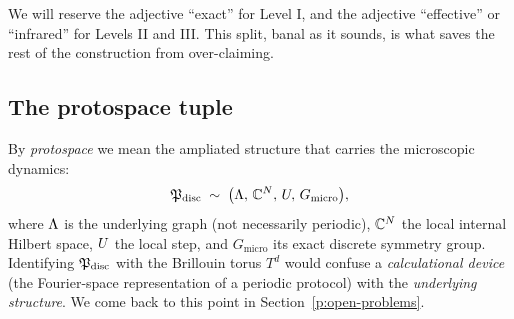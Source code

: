 We will reserve the adjective \enquote{exact} for Level I, and the
adjective \enquote{effective} or \enquote{infrared} for Levels II and
III. This split, banal as it sounds, is what saves the rest of the
construction from over-claiming.

\subsection{The protospace tuple}
By \emph{protospace} we mean the ampliated structure that carries the
microscopic dynamics:
\begin{equation}
\mathfrak{P}_{\mathrm{disc}} \;\sim\; \bigl(\Lambda,\,\mathbb{C}^{N},\,U,\,G_{\mathrm{micro}}\bigr) ,
\label{p:eq:proto-tuple}
\end{equation}
where $\Lambda$ is the underlying graph (not necessarily periodic),
$\mathbb{C}^{N}$ the local internal Hilbert space, $U$ the local step, and
$G_{\mathrm{micro}}$ its exact discrete symmetry group. Identifying
$\mathfrak{P}_{\mathrm{disc}}$ with the Brillouin torus $T^{d}$ would confuse a
\emph{calculational device} (the Fourier-space representation of a
periodic protocol) with the \emph{underlying structure}. We come back to
this point in Section~\ref{p:open-problems}.
